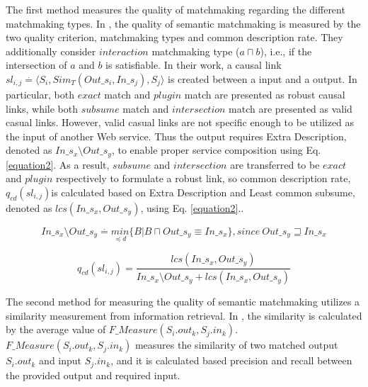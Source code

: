 The first method measures the quality of matchmaking regarding the different matchmaking types. In \cite{lecue2007making}, the quality of semantic matchmaking is measured by the two quality criterion, matchmaking types and common description rate. They additionally consider $interaction$ matchmaking type ($a \sqcap b$), i.e., if the intersection of $a$ and $b$ is satisfiable. In their work, a causal link \begin{math} sl_{i,j} \stackrel{.}{=} \langle S_i, Sim_{T}(Out\_s_i,In\_s_j),S_j  \rangle \end{math} is created between a input and a output. In particular, both $exact$ match and $plugin$ match are presented as robust causal links, while both $subsume$ match and $intersection$ match are presented as valid casual links. However, valid casual links are not specific enough to be utilized as the input of another Web service. Thus the output requires Extra Description, denoted as \begin{math} In\_s_x \setminus Out\_s_y \end{math}, to enable proper service composition using Eq. \ref{equation2}. As a result, $subsume$ and $intersection$ are transferred to be $exact$ and $plugin$ respectively to formulate a robust link, so common description rate, \begin{math} q_{cd}(sl_{i,j}) \end{math}is calculated based on Extra Description and Least common subsume, denoted as \begin{math} lcs (In\_s_x, Out\_s_y) \end{math}, using Eq. \ref{equation2}..

\begin{equation}
In\_s_x \setminus Out\_s_y \stackrel{.}{=} \underset {\preceq d}{min} \{ B|B\sqcap  Out\_s_y \equiv In\_s_x  \} , since \  Out\_s_y \sqsupseteq In\_s_x
 \label{equation2}
\end{equation}


\begin{equation}
q_{cd}(sl_{i,j}) = \frac{lcs (In\_s_x, Out\_s_y)} {In\_s_x \setminus Out\_s_y + lcs (In\_s_x, Out\_s_y)}
 \label{equation3}
\end{equation}

The second method for measuring the quality of semantic matchmaking utilizes a similarity measurement from information retrieval. In \cite{pop2009immune}, the similarity is calculated by the average value of $F\_Measure(S_i.out_k, S_j.in_k)$. $F\_Measure(S_i.out_k, S_j.in_k)$ measures the similarity of two matched output $S_i.out_k$ and input $S_j.in_k$, and it is calculated based precision and recall between the provided output and required input.


